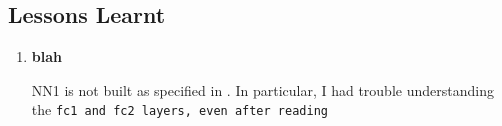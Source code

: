 \subsection{Lessons Learnt}

\begin{enumerate}[left=0pt]
    \item \bf{blah} 
    
    NN1 is not built as specified in \cite{facenet}.
    In particular, I had trouble understanding the \tt{fc1} and \tt{fc2} layers, even after reading \cite{maxout}
\end{enumerate}
